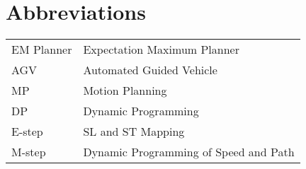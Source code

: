 \documentclass{thesisreport}
\begin{document}
  \section*{Abbreviations}
  \begin{tabular}{ll}
  EM Planner  & Expectation Maximum Planner\\
  AGV & Automated Guided Vehicle\\
  MP  & Motion Planning\\
  DP & Dynamic Programming\\
  E-step & SL and ST Mapping\\
  M-step & Dynamic Programming of Speed and Path
  
  \end{tabular}
  
 
 \newpage
 
 \listoffigures
 
 
 \tableofcontents
 
 
\end{document}
